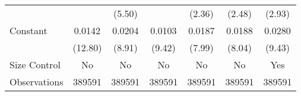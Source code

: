 {\begin{tabular}{l*{6}{c}}
                    &                     &      (5.50)         &                     &      (2.36)         &      (2.48)         &      (2.93)         \\
[1em]
Constant            &      0.0142\sym{***}&      0.0204\sym{***}&      0.0103\sym{***}&      0.0187\sym{***}&      0.0188\sym{***}&      0.0280\sym{***}\\
                    &     (12.80)         &      (8.91)         &      (9.42)         &      (7.99)         &      (8.04)         &      (9.43)         \\
\hline
Size Control        &          No         &          No         &          No         &          No         &          No         &         Yes         \\
Observations        &      389591         &      389591         &      389591         &      389591         &      389591         &      389591         \\
\hline\hline  \end{tabular}}
